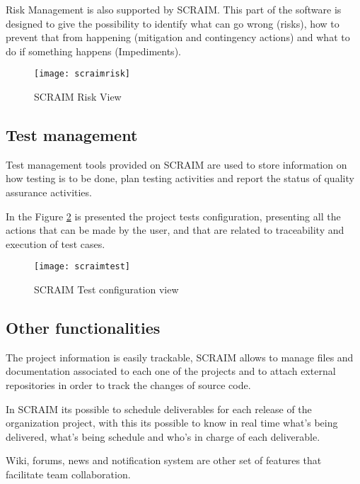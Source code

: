 Risk Management is also supported by SCRAIM. This part of the software is designed to give the possibility to identify what can go wrong (risks), how to prevent that from happening (mitigation and contingency actions) and what to do if something happens (Impediments).

\begin{figure}[h]
	\begin{center}
		\leavevmode
		\texttt{[image: scraimrisk]}
		\caption{SCRAIM Risk View}
		\label{fig:scraimrisk}
	\end{center}
\end{figure}

\subsection{Test management}
Test management tools provided on SCRAIM are used to store information on how testing is to be done, plan testing activities and report the status of quality assurance activities.

In the Figure \ref{fig:scraimtest} is presented the project tests configuration, presenting all the actions that can be made by the user, and that are related to traceability and execution of test cases.

\begin{figure}[h]
	\begin{center}
		\leavevmode
		\texttt{[image: scraimtest]}
		\caption{SCRAIM Test configuration view}
		\label{fig:scraimtest}
	\end{center}
\end{figure}


\subsection{Other functionalities}
The project information is easily trackable, SCRAIM allows  to manage files and documentation associated to each one of the projects and to attach external repositories in order to track the changes of source code.

In SCRAIM its possible to schedule deliverables for each release of the organization project, with this its possible to know in real time what's being delivered, what's being schedule and who's in charge of each deliverable.

Wiki, forums, news and notification system are other set of features that facilitate team collaboration.